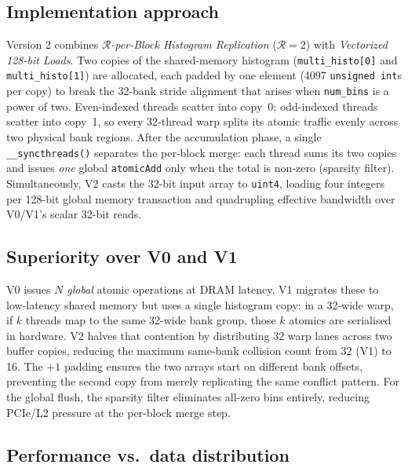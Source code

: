 \documentclass[11pt, letterpaper]{article}
\begin{document}
\subsection*{Implementation approach}

Version 2 combines \emph{$\mathcal{R}$-per-Block Histogram Replication} ($\mathcal{R}=2$)
with \emph{Vectorized 128-bit Loads}.
Two copies of the shared-memory histogram (\texttt{multi\_histo[0]} and
\texttt{multi\_histo[1]}) are allocated, each padded by one element (4097
\texttt{unsigned int}s per copy) to break the 32-bank stride alignment that
arises when \texttt{num\_bins} is a power of two.
Even-indexed threads scatter into copy~0; odd-indexed threads scatter into
copy~1, so every 32-thread warp splits its atomic traffic evenly across two
physical bank regions.
After the accumulation phase, a single \texttt{\_\_syncthreads()} separates
the per-block merge: each thread sums its two copies and issues \emph{one}
global \texttt{atomicAdd} only when the total is non-zero (sparsity filter).
Simultaneously, V2 casts the 32-bit input array to \texttt{uint4}, loading
four integers per 128-bit global memory transaction and quadrupling effective
bandwidth over V0/V1's scalar 32-bit reads.

\subsection*{Superiority over V0 and V1}

V0 issues $N$ \emph{global} atomic operations at DRAM latency.
V1 migrates these to low-latency shared memory but uses a single histogram
copy: in a 32-wide warp, if $k$ threads map to the same 32-wide bank group,
those $k$ atomics are serialised in hardware.
V2 halves that contention by distributing 32 warp lanes across two buffer
copies, reducing the maximum same-bank collision count from 32 (V1) to 16.
The $+1$ padding ensures the two arrays start on different bank offsets,
preventing the second copy from merely replicating the same conflict pattern.
For the global flush, the sparsity filter eliminates all-zero bins entirely,
reducing PCIe/L2 pressure at the per-block merge step.

\subsection*{Performance vs.\ data distribution}
\end{document}
